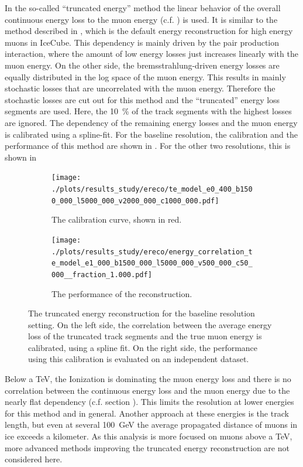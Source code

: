 In the so-called \enquote{truncated energy} method the linear behavior of the overall continuous energy loss to the muon energy (c.f. ) is used.
It is similar to the method described in \cite{IceCube2014Ereco}, which is the default energy reconstruction for high energy muons in IceCube.
This dependency is mainly driven by the pair production interaction, where the amount of low energy losses just increases linearly with the muon energy.
On the other side, the bremsstrahlung-driven energy losses are equally distributed in the log space of the muon energy.
This results in mainly stochastic losses that are uncorrelated with the muon energy.
Therefore the stochastic losses are cut out for this method and the \enquote{truncated} energy loss segments are used.
Here, the \SI{10}{\%} of the track segments with the highest losses are ignored.
The dependency of the remaining energy losses and the muon energy is calibrated using a spline-fit.
For the baseline resolution, the calibration and the performance of this method are shown in .
For the other two resolutions, this is shown in 
\begin{figure}
    \centering
    \begin{subfigure}{0.47\textwidth}
        \centering
        \texttt{[image: ./plots/results\_study/ereco/te\_model\_e0\_400\_b1500\_000\_l5000\_000\_v2000\_000\_c1000\_000.pdf]}
        \caption{The calibration curve, shown in red.}
        \label{fig:study_ereco_trunc_calib_base}
    \end{subfigure}
    \hfill
    \begin{subfigure}{0.47\textwidth}
        \centering
        \texttt{[image: ./plots/results\_study/ereco/energy\_correlation\_te\_model\_e1\_000\_b1500\_000\_l5000\_000\_v500\_000\_c50\_000\_\_fraction\_1.000.pdf]}
        \caption{The performance of the reconstruction.}
        \label{fig:study_ereco_trunc_perf_base_show}
    \end{subfigure}
    \caption{The truncated energy reconstruction for the baseline resolution setting. On the left side, the correlation between the average energy loss of the truncated track segments and the true muon energy is calibrated, using a spline fit. On the right side, the performance using this calibration is evaluated on an independent dataset.}
    \label{fig:study_ereco_trunc}
\end{figure}

Below a TeV, the Ionization is dominating the muon energy loss and there is no correlation between the continuous energy loss and the muon energy due to the nearly flat dependency (c.f. section ).
This limits the resolution at lower energies for this method and in general.
Another approach at these energies is the track length, but even at several \SI{100}{GeV} the average propagated distance of muons in ice exceeds a kilometer.
As this analysis is more focused on muons above a TeV, more advanced methods improving the truncated energy reconstruction are not considered here.

